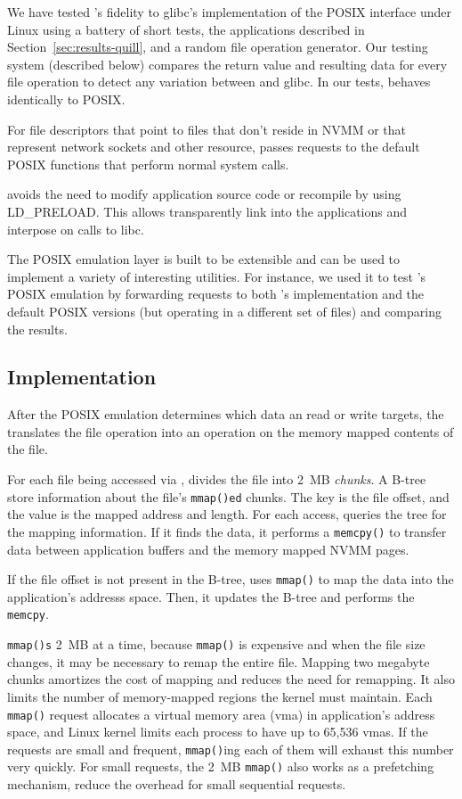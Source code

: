 We have tested \DAChell{}'s fidelity to glibc's implementation of the POSIX
interface under Linux using a battery of short tests, the applications
described in Section~\ref{sec:results-quill},
and a random file operation generator.
Our testing system (described below) compares the return value and resulting
data for every file operation to detect any variation between \DAChell{} and
glibc.  In our tests, \DAChell{} behaves identically to POSIX.

For file descriptors that point to files that don't reside in NVMM or that represent
network sockets and other resource, \DAChell{} passes requests to the default
POSIX functions that perform normal system calls.

\DAChell{} avoids the need to modify application source code or recompile by
using LD\_PRELOAD.  This allows \DAChell{} transparently link into the
applications and interpose on calls to libc.

The \DAChell{} POSIX emulation layer is built to be extensible and can be used to
implement a variety of interesting utilities.  For instance, we used it to test
\DAChell{}'s POSIX emulation by forwarding requests to both \DAChell{}'s
implementation and the default POSIX versions (but operating in a different set
of files) and comparing the results.

\subsection{Implementation}

After the POSIX emulation determines which data an read or write targets, the
\DAChell{} translates the file operation into an operation on the memory mapped
contents of the file.

For each file being accessed via \DAChell{}, \DAChell{} divides the file into
2~MB \emph{chunks}.  A B-tree store information about the file's
\texttt{mmap()ed} chunks.  The key is the file offset, and the value is the
mapped address and length.  For each access, \DAChell{} queries the tree for
the mapping information.  If it finds the data, it performs a \texttt{memcpy()}
to transfer data between application buffers and the memory mapped NVMM pages.

If the file offset is not present in the B-tree, \DAChell{} uses
\texttt{mmap()} to map the data into the application's addresss space. Then,
it updates the B-tree and performs the \texttt{memcpy}.

\DAChell{} \texttt{mmap()s} 2~MB at a time, because \texttt{mmap()} is expensive and when the file size changes, it may be necessary to remap the entire file. 
Mapping two megabyte chunks amortizes the cost of mapping and reduces the need for remapping.  It also limits the number of memory-mapped regions the kernel must maintain.
Each \texttt{mmap()} request allocates a
virtual memory area (vma) in application's address space, and Linux kernel limits each process to have up to 65,536 vmas. If the requests are small and frequent,
\texttt{mmap()}ing each of them will exhaust this number very quickly. 
For small requests, the 2~MB \texttt{mmap()} also works as a prefetching mechanism, reduce the overhead for small sequential requests.

